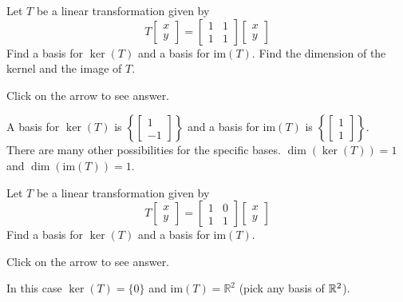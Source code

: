 \documentclass{ximera}
\begin{document}
\begin{problem}\label{prb:6.28}
 Let $T$ be a linear transformation given by
\[
T \left[ \begin{array}{r}
x\\
y
\end{array}\right] = \left[ \begin{array}{rrr}
1 &1  \\
1 & 1
\end{array}\right]
\left[ \begin{array}{r}
x\\
y
\end{array}\right]
\]
Find a basis for $\ker \left( T\right)$ and a basis for $\mbox{im} \left( T\right) $. Find the dimension of the kernel and the image  of $T$.

Click on the arrow to see answer.
\begin{expandable}
A basis for $\ker \left( T\right)$ is
$\left\{ \left[
\begin{array}{r}
1 \\
-1
\end{array}
\right] \right\}$
and a basis for $\mbox{im} \left( T\right)$ is
$\left\{ \left[
\begin{array}{r}
1 \\
1
\end{array}
\right] \right\}$. \\
There are many other possibilities for the specific bases. $\dim \left( \ker \left( T\right) \right)=1 $ and $\dim \left( \mbox{im} \left( T\right) \right)=1$.
\end{expandable}

\end{problem}


\begin{problem}\label{prb:6.29}
 Let $T$ be a linear transformation given by
\[
T \left[ \begin{array}{r}
x\\
y
\end{array}\right] = \left[ \begin{array}{rrr}
1 & 0  \\
1 & 1
\end{array}\right]
\left[ \begin{array}{r}
x\\
y
\end{array}\right]
\]
Find a basis for $\ker \left( T\right)$ and a basis for $\mbox{im}
\left( T\right) $.

Click on the arrow to see answer.

\begin{expandable}
In this case $\ker \left( T\right) =\{0\}$
and $\mbox{im} \left( T\right) = \mathbb{R}^2$ (pick any basis of $\mathbb{R}^2$).
\end{expandable}

\end{problem}
\end{document}
